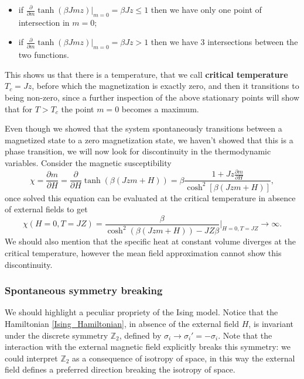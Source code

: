 \begin{itemize}
    \item if $\frac{\partial}{\partial m}\tanh(\beta Jmz)\big|_{m=0}=\beta Jz\leq1$ then we have only one point of intersection in $m=0$;
    \item if $\frac{\partial}{\partial m}\tanh(\beta Jmz)\big|_{m=0}=\beta Jz>1$ then we have 3 intersections between the two functions.
\end{itemize}
This shows us that there is a temperature, that we call \textbf{critical temperature} $T_c=Jz$, before which the magnetization is exactly zero, and then it transitions to being non-zero, since a further inspection of the above stationary points will show that for $T>T_c$ the point $m=0$ becomes a maximum.

Even though we showed that the system spontaneously transitions between a magnetized state to a zero magnetization state, we haven't showed that this is a phase transition, we will now look for discontinuity in the thermodynamic variables. Consider the magnetic susceptibility
\begin{equation*}
    \chi=\frac{\partial m}{\partial H}=\frac{\partial }{\partial H}\tanh(\beta(Jzm+H))=\beta\frac{1+Jz\frac{\partial m}{\partial H}}{\cosh^2[\beta(Jzm+H)]},
\end{equation*}
once solved this equation can be evaluated at the critical temperature in absence of external fields to get
\begin{equation}
    \chi(H=0,T=JZ)=\frac{\beta}{\cosh^2(\beta(Jzm+H))-JZ\beta}\bigg|_{H=0,T=JZ}\rightarrow\infty.
\end{equation}
We should also mention that the specific heat at constant volume diverges at the critical temperature, however the mean field approximation cannot show this discontinuity.
\subsubsection{Spontaneous symmetry breaking}
We should highlight a peculiar propriety of the Ising model. Notice that the Hamiltonian \eqref{Ising_Hamiltonian}, in absence of the external field $H$, is invariant under the discrete symmetry $\mathbb{Z}_2$, defined by $\sigma_i\rightarrow\sigma_i'=-\sigma_i$. Note that the interaction with the external magnetic field explicitly breaks this symmetry: we could interpret $\mathbb{Z}_2$ as a consequence of isotropy of space, in this way the external field defines a preferred direction breaking the isotropy of space.

